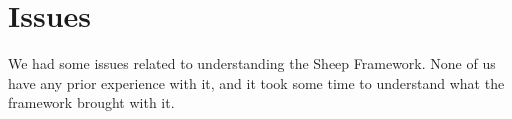 \section{Issues}
\label{sec:issues}
 
We had some issues related to understanding the Sheep Framework. None of us have any prior experience with it, and it took some time to understand what the framework brought with it. 
